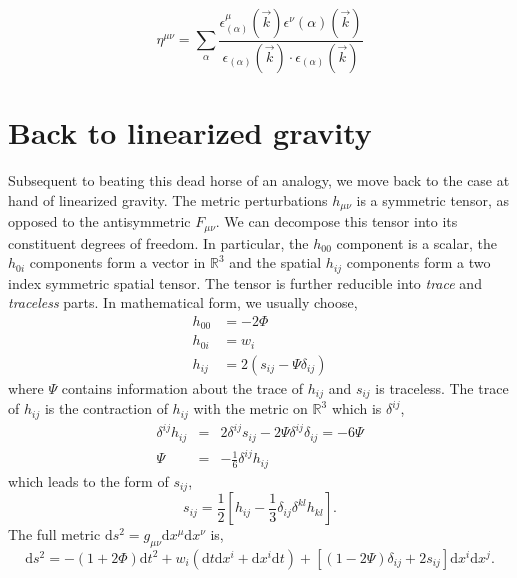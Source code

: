 \begin{equation}
    \eta^{\mu\nu} = \sum_{\alpha}\frac{\epsilon^{\mu}_{(\alpha)}(\vec{k})\epsilon^{\nu}{(\alpha)}(\vec{k})}{\epsilon_{(\alpha)}(\vec{k})\cdot\epsilon_{(\alpha)}(\vec{k})}
\end{equation}



\section{Back to linearized gravity}
Subsequent to beating this dead horse of an analogy, we move back to the case at hand of linearized gravity. The metric perturbations $h_{\mu\nu}$ is a symmetric tensor, as opposed to the antisymmetric $F_{\mu\nu}$. We can decompose this tensor into its constituent degrees of freedom. In particular, the $h_{00}$ component is a scalar, the $h_{0i}$ components form a vector in $\mathbb{R}^3$ and the spatial $h_{ij}$ components form a two index symmetric spatial tensor. The tensor is further reducible into \textit{trace} and \textit{traceless} parts. In mathematical form, we usually choose, 
\begin{equation}\label{metric-dof}
    \begin{split}
    h_{00} &= -2\Phi\\
    h_{0i} &= w_{i}\\
    h_{ij} &= 2\left(s_{ij} - \Psi\delta_{ij}\right)
    \end{split}
\end{equation}
where $\Psi$ contains information about the trace of $h_{ij}$ and $s_{ij}$ is traceless. The trace of $h_{ij}$ is the contraction of $h_{ij}$ with the metric on $\mathbb{R}^3$ which is $\delta^{ij}$, 
\begin{eqnarray*}
    \delta^{ij}h_{ij} &=& 2\delta^{ij}s_{ij} -2\Psi\delta^{ij}\delta_{ij}=  - 6 \Psi\nonumber\\
    \Psi &=& -\frac{1}{6}\delta^{ij}h_{ij}
\end{eqnarray*}
which leads to the form of $s_{ij}$,
\begin{equation}
    s_{ij} = \frac{1}{2}\left[h_{ij} - \frac{1}{3}\delta_{ij}\delta^{kl}h_{kl}\right].
\end{equation}
The full metric $\text{d}s^2 = g_{\mu\nu}\text{d}x^{\mu}\text{d}x^{\nu}$ is, 
\begin{equation*}
    \text{d}s^2 = -(1+2\Phi)\text{d}t^2 + w_{i}(\text{d}t\text{d}x^i + \text{d}x^i\text{d}t) + [(1-2\Psi)\delta_{ij} + 2s_{ij}]\text{d}x^i\text{d}x^j.
\end{equation*}
